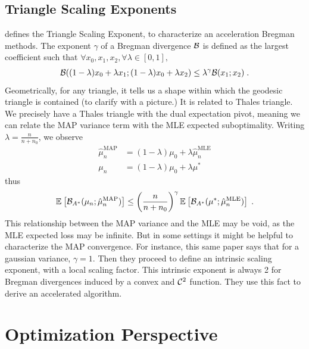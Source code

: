 \documentclass{article}
\newcommand*{\expect}[2][]{\ensuremath{\mathbb{E}_{#1} \left[ #2 \right] }} %
\newcommand{\logpart}{A}
\newcommand{\bregmanconj}{\cB_{\logpart^*}}
\newcommand{\MAPm}{\hat \mu_n}
\begin{document}
\subsection{Triangle Scaling Exponents}

\citet{hanzely2021accelerated} 
defines the Triangle Scaling Exponent, to characterize an acceleration Bregman methods. The exponent $\gamma$ of a Bregman divergence ${\mathcal B}$ is defined as the largest coefficient such that $
	\forall x_0, x_1, x_2, \forall \lambda\in[0,1],$
\begin{align}
	{\mathcal B}((1-\lambda)x_0 + \lambda x_1 ; (1-\lambda)x_0 + \lambda x_2)
	\leq \lambda^\gamma {\mathcal B}(x_1 ; x_2) \; .
\end{align}
Geometrically, for any triangle, it tells us a shape within which the geodesic triangle is contained (to clarify with a picture.)
It is related to Thales triangle.
We precisely have a Thales triangle with the dual expectation pivot, meaning we can relate the MAP variance term with the MLE expected suboptimality. Writing $\lambda = \frac{n}{n+n_0}$, we observe
\begin{align}
	\MAPm^\text{MAP} &= (1-\lambda)\mu_0 + \lambda \MAPm^\text{MLE} \\
	\mu_n &= (1-\lambda)\mu_0 + \lambda \mu^*
\end{align}
thus
\begin{align}
	\expect{\bregmanconj(\mu_n; \MAPm^\text{MAP})}
	\leq \left (\frac{n}{n+n_0} \right)^\gamma \expect{\bregmanconj(\mu^*; \MAPm^\text{MLE})} \; .
\end{align}
This relationship between the MAP variance and the MLE may be void, as the MLE expected loss may be infinite. But in some settings it might be helpful to characterize the MAP convergence.
For instance, this same paper says that for a gaussian variance, $\gamma=1$. Then they proceed to define an intrinsic scaling exponent, with a local scaling factor. This intrinsic exponent is always 2 for Bregman divergences induced by a convex and ${\mathcal C}^2$ function. They use this fact to derive an accelerated algorithm.

\clearpage

\section{Optimization Perspective}
\end{document}
